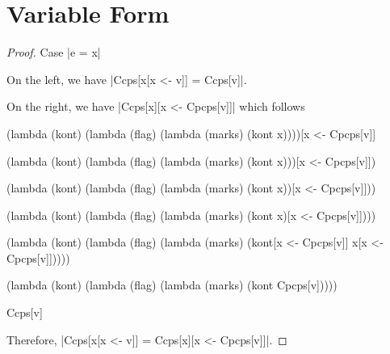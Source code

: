 \section{Variable Form}
\begin{proof}{Case \scheme|e = x|}

On the left, we have \scheme|Ccps[x[x <- v]] = Ccps[v]|.

On the right, we have \scheme|Ccps[x][x <- Cpcps[v]]| which follows
\begin{schemeblock}
\begin{schemedisplay}
(lambda (kont)
  (lambda (flag)
    (lambda (marks)
      (kont x))))[x <- Cpcps[v]]
\end{schemedisplay}
\end{schemeblock}

\begin{schemeblock}
\begin{schemedisplay}
(lambda (kont)
  (lambda (flag)
    (lambda (marks)
      (kont x)))[x <- Cpcps[v]])
\end{schemedisplay}
\end{schemeblock}

\begin{schemeblock}
\begin{schemedisplay}
(lambda (kont)
  (lambda (flag)
    (lambda (marks)
      (kont x))[x <- Cpcps[v]]))
\end{schemedisplay}
\end{schemeblock}

\begin{schemeblock}
\begin{schemedisplay}
(lambda (kont)
  (lambda (flag)
    (lambda (marks)
      (kont x)[x <- Cpcps[v]])))
\end{schemedisplay}
\end{schemeblock}

\begin{schemeblock}
\begin{schemedisplay}
(lambda (kont)
  (lambda (flag)
    (lambda (marks)
      (kont[x <- Cpcps[v]] x[x <- Cpcps[v]]))))
\end{schemedisplay}
\end{schemeblock}

\begin{schemeblock}
\begin{schemedisplay}
(lambda (kont)
  (lambda (flag)
    (lambda (marks)
      (kont Cpcps[v]))))
\end{schemedisplay}
\end{schemeblock}

\begin{schemeblock}
\begin{schemedisplay}
Ccps[v]
\end{schemedisplay}
\end{schemeblock}

Therefore, \scheme|Ccps[x[x <- v]] = Ccps[x][x <- Cpcps[v]]|.
\end{proof}

